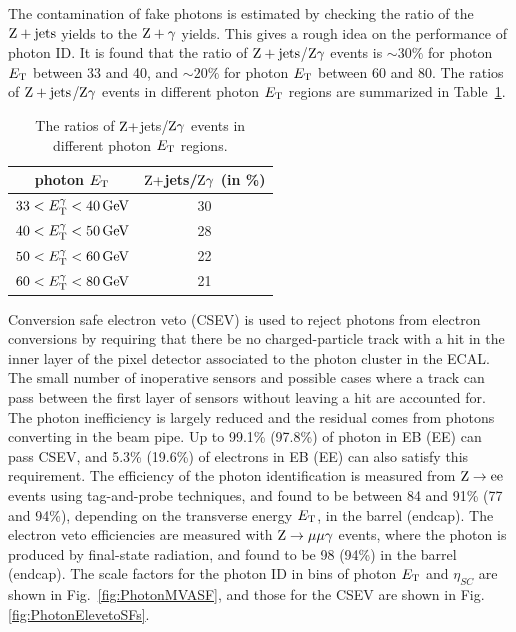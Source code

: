 		The contamination of fake photons is estimated by checking the ratio of the $\mathrm{Z}+\text{jets}$ yields to the $\mathrm{Z}+\gamma$ yields. This gives a rough idea on the performance of photon ID. 
		It is found that the ratio of $\mathrm{Z}+\text{jets}$/$\mathrm{Z}\gamma$ events is $\sim 30\%$ for photon $E_{\mathrm{T}}$ between 33 and 40\GeV, and $\sim 20\%$ for photon $E_{\mathrm{T}}$ between 60 and 80\GeV. The ratios of $\mathrm{Z}+\text{jets}$/$\mathrm{Z}\gamma$ events in different photon $E_{\mathrm{T}}$ regions are summarized in Table~\ref{tab:fakephoratio}. 
		
		\begin{table}[!ht]
		    \begin{center}
		    \begin{tabular}{c|c}
		      photon $E_{\mathrm{T}}$  &  $\mathrm{Z}+$jets/$\mathrm{Z}\gamma$ (in \%)\\
		      \hline
		      $33<E_{\mathrm{T}}^{\gamma}<40\,\text{Ge\hspace{-.08em}V}$ & 30 \\
		      $40<E_{\mathrm{T}}^{\gamma}<50\,\text{Ge\hspace{-.08em}V}$ & 28 \\
		      $50<E_{\mathrm{T}}^{\gamma}<60\,\text{Ge\hspace{-.08em}V}$ & 22 \\
		      $60<E_{\mathrm{T}}^{\gamma}<80\,\text{Ge\hspace{-.08em}V}$ & 21 \\
		    \end{tabular}
		    \caption{The ratios of $\mathrm{Z}+$jets/$\mathrm{Z}\gamma$ events in different photon $E_{\mathrm{T}}$ regions.\label{tab:fakephoratio}}
		    \end{center}
		\end{table}
		
		Conversion safe electron veto (CSEV) is used to reject photons from electron conversions by requiring that there be no charged-particle track with a hit in the inner layer of the pixel detector associated to the photon cluster in the ECAL. The small number of inoperative sensors and possible cases where a track can pass between the first layer of sensors without leaving a hit are accounted for. The photon inefficiency is largely reduced and the residual comes from photons converting in the beam pipe. Up to 99.1\% (97.8\%) of photon in EB (EE) can pass CSEV, and 5.3\% (19.6\%) of electrons in EB (EE) can also satisfy this requirement. 
The efficiency of the photon identification is measured from $\mathrm{Z}\to\mathrm{e}\mathrm{e}$ events using tag-and-probe techniques, and found to be between 84 and 91\% (77 and 94\%), depending on the transverse energy $E_{\mathrm{T}}$, in the barrel (endcap). The electron veto efficiencies are measured with $\mathrm{Z}\to\mu\mu\gamma$ events, where the photon is produced by final-state radiation, and found to be 98 (94\%) in the barrel (endcap). The scale factors for the photon ID in bins of photon $E_{\mathrm{T}}$ and $\eta_{SC}$ are shown in Fig.~\ref{fig:PhotonMVASF}, and those for the CSEV are shown in Fig.\ref{fig:PhotonElevetoSFs}.	
		
